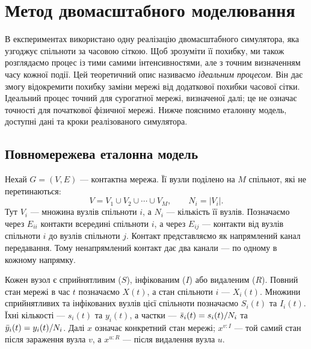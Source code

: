 \clearpage
\section{Метод двомасштабного моделювання}
\label{sec:method}

В експериментах використано одну реалізацію двомасштабного симулятора, яка узгоджує спільноти за часовою сіткою. Щоб зрозуміти її похибку, ми також розглядаємо процес із тими самими інтенсивностями, але з точним визначенням часу кожної події. Цей теоретичний опис називаємо \emph{ідеальним процесом}. Він дає змогу відокремити похибку заміни мережі від додаткової похибки часової сітки. Ідеальний процес точний для сурогатної мережі, визначеної далі; це не означає точності для початкової фізичної мережі. Нижче пояснимо еталонну модель, доступні дані та кроки реалізованого симулятора.

\subsection{Повномережева еталонна модель}
\label{sec:reference}

Нехай $G=(V,E)$ --- контактна мережа. Її вузли поділено на $M$ спільнот, які не перетинаються:
\begin{equation}
\label{eq:partition}
V=V_1\cup V_2\cup\cdots\cup V_M,
\qquad N_i=|V_i|.
\end{equation}
Тут $V_i$ --- множина вузлів спільноти $i$, а $N_i$ --- кількість її вузлів. Позначаємо через $E_{ii}$ контакти всередині спільноти $i$, а через $E_{ij}$ --- контакти від вузлів спільноти $i$ до вузлів спільноти $j$. Контакт представляємо як напрямлений канал передавання. Тому ненапрямлений контакт дає два канали --- по одному в кожному напрямку.

Кожен вузол є сприйнятливим ($S$), інфікованим ($I$) або видаленим ($R$). Повний стан мережі в час $t$ позначаємо $X(t)$, а стан спільноти $i$ --- $X_i(t)$. Множини сприйнятливих та інфікованих вузлів цієї спільноти позначаємо $S_i(t)$ та $I_i(t)$. Їхні кількості --- $s_i(t)$ та $y_i(t)$, а частки --- $\bar{s}_i(t)=s_i(t)/N_i$ та $\bar{y}_i(t)=y_i(t)/N_i$. Далі $x$ означає конкретний стан мережі; $x^{v:I}$ --- той самий стан після зараження вузла $v$, а $x^{u:R}$ --- після видалення вузла $u$.

